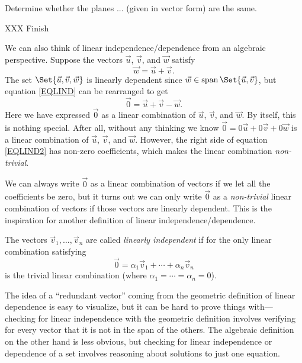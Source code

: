 \begin{example}
	Determine whether the planes ... (given in vector form) are the same.

	XXX Finish
\end{example}

We can also think of linear independence/dependence from an algebraic perspective.
Suppose the vectors $\vec u$, $\vec v$, and $\vec w$ satisfy 
\begin{equation}
	\label{EQLIND}
	\vec w=\vec u+\vec v.
\end{equation}
The set
$\Set{\vec u,\vec v,\vec w}$ is linearly dependent since $\vec w\in\Span\Set{\vec u,\vec v}$,
but equation \eqref{EQLIND} can be rearranged
to get
\begin{equation}
	\label{EQLIND2}
	\vec 0=\vec u+\vec v-\vec w.
\end{equation}
Here we have expressed $\vec 0$ as a linear combination of $\vec u$, $\vec v$, and $\vec w$.
By itself, this is nothing special. After all, without any thinking we know $\vec 0=0\vec u+0\vec v+0\vec w$
is a linear combination of $\vec u$, $\vec v$, and $\vec w$. However, the right side of equation \eqref{EQLIND2} has non-zero
coefficients, which makes the linear combination \emph{non-trivial}.


We can always write $\vec 0$ as a linear combination of vectors if we let all the coefficients
be zero, but it turns out we can only write $\vec 0$ as a \emph{non-trivial} linear combination
of vectors if those vectors are linearly dependent. This is the inspiration for another definition
of linear independence/dependence.

\begin{definition}
	\label{DEFLININDII}
	The vectors $\vec v_1,\ldots,\vec v_n$ are called \emph{linearly independent}
	if for the only linear combination satisfying
	\[
		\vec 0=\alpha_1\vec v_1+\cdots+\alpha_n\vec v_n
	\]
	is the trivial linear combination (where $\alpha_1=\cdots=\alpha_n=0$).
\end{definition}

The idea of a ``redundant vector'' coming from the geometric definition of linear dependence
is easy to visualize, but it can be hard to prove things with---checking for linear independence
with the geometric definition involves verifying for every vector that it is not in the span of the others.
The algebraic definition on the other hand is less obvious, but checking for linear independence or dependence
of a set involves reasoning about solutions to just one equation.

